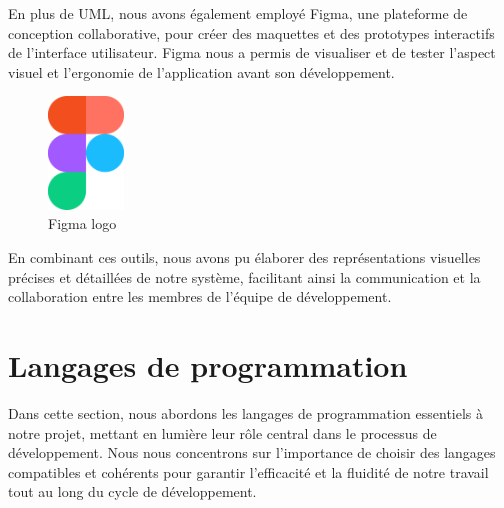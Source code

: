En plus de UML, nous avons également employé Figma, une plateforme de conception collaborative, pour créer des maquettes et des prototypes interactifs de l'interface utilisateur. Figma nous a permis de visualiser et de tester l'aspect visuel et l'ergonomie de l'application avant son développement.
\\
\begin{figure}[H]
    \centering
    \includegraphics[width=2cm]{Figures/figma logo.png}
    \caption{Figma logo}
\end{figure}

En combinant ces outils, nous avons pu élaborer des représentations visuelles précises et détaillées de notre système, facilitant ainsi la communication et la collaboration entre les membres de l'équipe de développement.





\section{Langages de programmation}

\hspace{\parindent}Dans cette section, nous abordons les langages de programmation essentiels à notre projet, mettant en lumière leur rôle central dans le processus de développement. Nous nous concentrons sur l'importance de choisir des langages compatibles et cohérents pour garantir l'efficacité et la fluidité de notre travail tout au long du cycle de développement.

